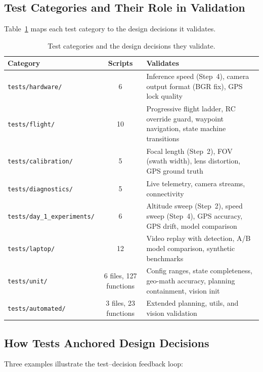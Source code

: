 \documentclass[10pt,a4paper]{article}
\newcommand{\compactTable}{\small\setlength{\tabcolsep}{3pt}\renewcommand{\arraystretch}{1.05}}
\begin{document}
\subsection{Test Categories and Their Role in Validation}

Table~\ref{tab:test-categories} maps each test category to the design decisions it validates.

\begin{table}[H]
  \centering\compactTable
  \caption{Test categories and the design decisions they validate.}\label{tab:test-categories}
  \begin{tabularx}{\linewidth}{@{}l c X@{}}
    \toprule
    \textbf{Category} & \textbf{Scripts} & \textbf{Validates} \\
    \midrule
    \texttt{tests/hardware/}         & 6  & Inference speed (Step~4), camera output format (BGR fix), GPS lock quality \\
    \texttt{tests/flight/}           & 10 & Progressive flight ladder, RC override guard, waypoint navigation, state machine transitions \\
    \texttt{tests/calibration/}      & 5  & Focal length (Step~2), FOV (swath width), lens distortion, GPS ground truth \\
    \texttt{tests/diagnostics/}      & 5  & Live telemetry, camera streams, connectivity \\
    \texttt{tests/day\_1\_experiments/} & 6  & Altitude sweep (Step~2), speed sweep (Step~4), GPS accuracy, GPS drift, model comparison \\
    \texttt{tests/laptop/}           & 12 & Video replay with detection, A/B model comparison, synthetic benchmarks \\
    \texttt{tests/unit/}             & 6 files, 127 functions & Config ranges, state completeness, geo-math accuracy, planning containment, vision init \\
    \texttt{tests/automated/}        & 3 files, 23 functions  & Extended planning, utils, and vision validation \\
    \bottomrule
  \end{tabularx}
\end{table}

\subsection{How Tests Anchored Design Decisions}

Three examples illustrate the test--decision feedback loop:
\end{document}
